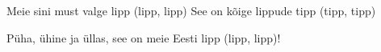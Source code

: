 Meie sini must valge lipp (lipp, lipp)
See on k\~oige lippude tipp (tipp, tipp)

P\"uha, \"uhine ja \"ullas, see on meie Eesti lipp (lipp, lipp)!
